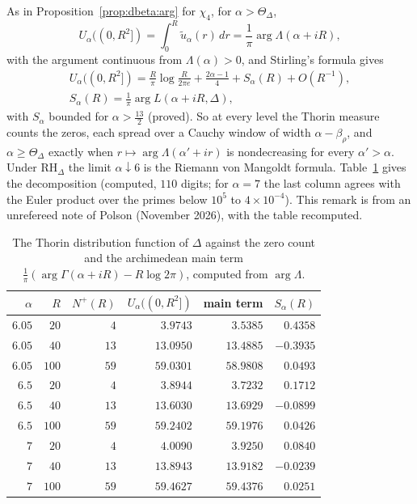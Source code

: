 \begin{remark}\label{dl:rem:arg}
As in Proposition~\ref{prop:dbeta:arg} for $\chi_4$, for $\alpha>\Theta_\Delta$,
\[U_\alpha((0,R^2])=\int_0^R\tilde u_\alpha(r)\,dr=\frac1\pi\arg\Lambda(\alpha+iR),\]
with the argument continuous from $\Lambda(\alpha)>0$, and Stirling's formula gives
\begin{gather*}
U_\alpha((0,R^2])=\frac R\pi\log\frac R{2\pi e}+\frac{2\alpha-1}4+S_\alpha(R)+O(R^{-1}),\\
S_\alpha(R)=\frac1\pi\arg L(\alpha+iR,\Delta),
\end{gather*}
with $S_\alpha$ bounded for $\alpha>\frac{13}2$ (proved). So at every level the Thorin measure counts the zeros, each spread over a Cauchy window of width $\alpha-\beta_\rho$, and $\alpha\ge\Theta_\Delta$ exactly when $r\mapsto\arg\Lambda(\alpha'+ir)$ is nondecreasing for every $\alpha'>\alpha$. Under $\mathrm{RH}_\Delta$ the limit $\alpha\downarrow6$ is the Riemann von Mangoldt formula. Table~\ref{dl:tab:arg} gives the decomposition (computed, $110$ digits; for $\alpha=7$ the last column agrees with the Euler product over the primes below $10^5$ to $4\times10^{-4}$). This remark is from an unrefereed note of Polson (November 2026), with the table recomputed.
\end{remark}

\begin{table}[htbp]
\centering\small
\begin{tabular}{rrrrrr}
\toprule
$\alpha$ & $R$ & $N^+(R)$ & $U_\alpha((0,R^2])$ & main term & $S_\alpha(R)$\\
\midrule
$6.05$ & $20$ & $4$ & $3.9743$ & $3.5385$ & $0.4358$\\
$6.05$ & $40$ & $13$ & $13.0950$ & $13.4885$ & $-0.3935$\\
$6.05$ & $100$ & $59$ & $59.0301$ & $58.9808$ & $0.0493$\\
$6.5$ & $20$ & $4$ & $3.8944$ & $3.7232$ & $0.1712$\\
$6.5$ & $40$ & $13$ & $13.6030$ & $13.6929$ & $-0.0899$\\
$6.5$ & $100$ & $59$ & $59.2402$ & $59.1976$ & $0.0426$\\
$7$ & $20$ & $4$ & $4.0090$ & $3.9250$ & $0.0840$\\
$7$ & $40$ & $13$ & $13.8943$ & $13.9182$ & $-0.0239$\\
$7$ & $100$ & $59$ & $59.4627$ & $59.4376$ & $0.0251$\\
\bottomrule
\end{tabular}
\caption{The Thorin distribution function of $\Delta$ against the zero count and the archimedean main term $\frac1\pi(\arg\Gamma(\alpha+iR)-R\log2\pi)$, computed from $\arg\Lambda$.}\label{dl:tab:arg}
\end{table}


